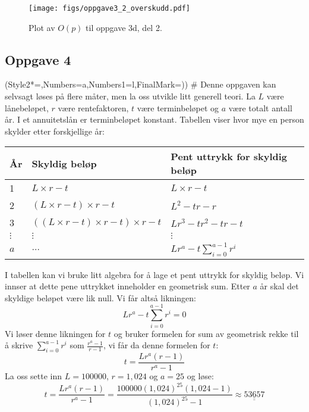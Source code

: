 \documentclass[12pt, a4paper]
{article}						%
\def\answer#1{\underline{\underline{#1}}}
\begin{document}
\begin{easylist}[enumerate]
		\begin{figure}[th!]
			\centering
			\texttt{[image: figs/oppgave3\_2\_overskudd.pdf]}
			\caption{Plot av $O(p)$ til oppgave 3d, del 2.}
			\label{fig:oppgave3_3}
		\end{figure}
	\end{easylist}
	
	\subsection*{Oppgave 4}
	\begin{easylist}[enumerate]
		\ListProperties(Style2*=,Numbers=a,Numbers1=l,FinalMark={)})
		# Denne oppgaven kan selvsagt løses på flere måter, men la oss utvikle litt generell teori.
		La $L$ være lånebeløpet, $r$ være rentefaktoren, $t$ være terminbeløpet og $a$ være totalt antall år.
		I et annuitetslån er terminbeløpet konstant. Tabellen viser hvor mye
		en person skylder etter forskjellige år:
		\begin{center}
			\begin{tabular}{l|l|l}
				\textbf{År} & \textbf{Skyldig beløp} & \textbf{Pent uttrykk for skyldig beløp} \\ \hline
				1 & $L\times r - t$ & $L\times r - t$ \\
				2 & $\left(L\times r - t\right) \times r - t$ & $L^2 - tr -r$ \\
				3 & $\left( \left(L\times r - t\right) \times r - t  \right) \times r - t$ & $Lr^3 - tr^2 - tr - t$ \\
				$\vdots$ & $\vdots$ & $\vdots$ \\
				$a$ & $\dots$ & $Lr^a - t \sum_{i=0}^{a-1} r^i$ 
			\end{tabular}
		\end{center}
		I tabellen kan vi bruke litt algebra for å lage et pent uttrykk for skyldig beløp.
		Vi innser at dette pene uttrykket inneholder en geometrisk sum. 
		Etter $a$ år skal det skyldige beløpet være lik null. Vi får altså likningen:
		\begin{equation*}
		Lr^a - t \sum_{i=0}^{a-1} r^i = 0
		\end{equation*}
		Vi løser denne likningen for $t$ og bruker formelen for sum av geometrisk rekke til å skrive $\sum_{i=0}^{a-1} r^i$ som $ \frac{r^a-1}{r-1}$, vi får da denne formelen for $t$:
		\begin{equation}
		\label{renteformel}
		t = \frac{Lr^a(r-1)}{r^a-1}
		\end{equation}
		La oss sette inn $L = 100000$, $r = 1,024$ og $a = 25$ og løse:
		\begin{equation*}
		t = \frac{Lr^a(r-1)}{r^a-1} = \frac{100000\left(1,024\right)^{25}(1,024-1)}{\left(1,024\right)^{25}-1} \approx \answer{53657}
		\end{equation*}
		

\end{easylist}
\end{document}
